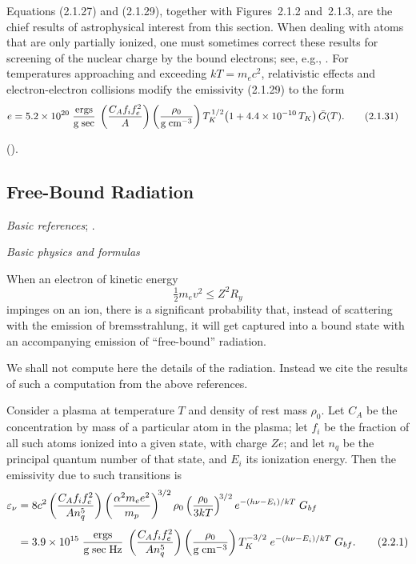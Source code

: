 Equations (2.1.27) and (2.1.29), together with Figures~2.1.2 and~2.1.3, are
the chief results of astrophysical interest from this section.  When dealing with
atoms that are only partially ionized, one must sometimes correct these results
for screening of the nuclear charge by the bound electrons; see, e.g.,
\citet{Ginzburg1967}.  For temperatures approaching and exceeding $kT = m_e c^2$,
relativistic effects and electron-electron collisions modify the emissivity
(2.1.29) to the form
\begin{align}
e &= 5.2 \times 10^{20}\;
\frac{\text{ergs}}{\text{g\;sec}}\;
\left(\frac{C_A f_i f_e^2}{A}\right)
\left(\frac{\rho_0}{\text{g\;cm}^{-3}}\right)
T_K^{\,1/2}\bigl(1 + 4.4 \times 10^{-10}\,T_K\bigr)\,\bar{G}(T).
\tag{2.1.31}
\end{align}

\noindent (\citealt{Ginzburg1967}).



\subsection{Free-Bound Radiation}
\label{sec:2.2}

\textit{Basic references}\quad \citet{Jackson1962}; \citet{Ginzburg1967}.

\bigskip
\textit{Basic physics and formulas}

When an electron of kinetic energy
\begin{equation}
\tfrac{1}{2}m_e v^2 \leq Z^2 R_y
\end{equation}
impinges on an ion, there is a significant probability that, instead of scattering
with the emission of bremsstrahlung, it will get captured into a bound state with
an accompanying emission of ``free-bound'' radiation.

We shall not compute here the details of the radiation.  Instead we cite the
results of such a computation from the above references.

Consider a plasma at temperature $T$ and density of rest mass $\rho_0$.  Let $C_A$ be
the concentration by mass of a particular atom in the plasma; let $f_i$ be the fraction
of all such atoms ionized into a given state, with charge $Ze$; and let $n_q$ be the
principal quantum number of that state, and $E_i$ its
ionization energy.  Then the emissivity due to such transitions is
\begin{align}
\varepsilon_\nu &= 8c^2
\left(\frac{C_A f_i f_e^2}{An_q^5}\right)
\left(\frac{\alpha^2 m_e e^2}{m_p}\right)^{\!3/2}
\rho_0
\left(\frac{\rho_0}{3kT}\right)^{\!3/2}
e^{-(h\nu - E_i)/kT}\;G_{bf}
\notag\\[4pt]
&= 3.9 \times 10^{15}\;
\frac{\text{ergs}}{\text{g\;sec\;Hz}}\;
\left(\frac{C_A f_i f_e^2}{An_q^5}\right)
\left(\frac{\rho_0}{\text{g\;cm}^{-3}}\right)
T_K^{-3/2}\;e^{-(h\nu - E_i)/kT}\;G_{bf}.
\tag{2.2.1}
\end{align}

